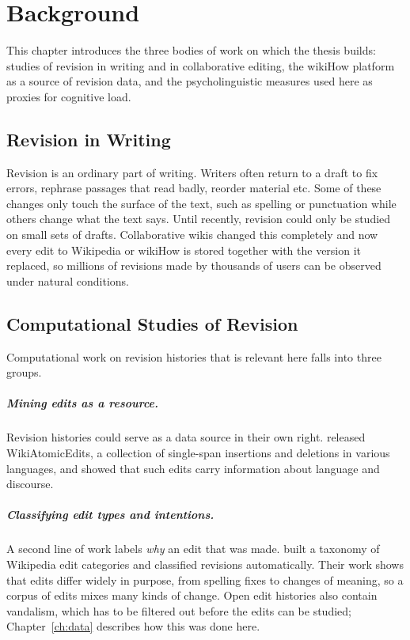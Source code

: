 \documentclass[12pt,a4paper,oneside]{report}
\begin{document}
\chapter{Background}
\label{ch:background}

This chapter introduces the three bodies of work on which the thesis builds: studies of revision in writing and in collaborative editing, the wikiHow platform as a source of revision data, and the psycholinguistic measures used here as proxies for cognitive load.

\section{Revision in Writing}
Revision is an ordinary part of writing. Writers often return to a draft to fix errors, rephrase passages that read badly, reorder material etc. Some of these changes only touch the surface of the text, such as spelling or punctuation while others change what the text says. Until recently, revision could only be studied on small sets of drafts. Collaborative wikis changed this completely and now every edit to Wikipedia or wikiHow is stored together with the version it replaced, so millions of revisions made by thousands of users can be observed under natural conditions.

\section{Computational Studies of Revision}
Computational work on revision histories that is relevant here falls into three groups.

\paragraph{Mining edits as a resource.} Revision histories could serve as a data source in their own right. \citet{faruqui2018} released WikiAtomicEdits, a collection of single-span insertions and deletions in various languages, and showed that such edits carry information about language and discourse.

\paragraph{Classifying edit types and intentions.} A second line of work labels \emph{why} an edit that was made. \citet{daxenberger2013} built a taxonomy of Wikipedia edit categories and classified revisions automatically. Their work shows that edits differ widely in purpose, from spelling fixes to changes of meaning, so a corpus of edits mixes many kinds of change. Open edit histories also contain vandalism, which has to be filtered out before the edits can be studied; Chapter~\ref{ch:data} describes how this was done here.
\end{document}
